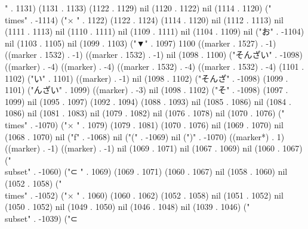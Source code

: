 " . 1131) (1131 . 1133) (1122 . 1129) nil (1120 . 1122) nil (1114 . 1120) ("\\times" . -1114) ("×
" . 1122) (1122 . 1124) (1114 . 1120) nil (1112 . 1113) nil (1111 . 1113) nil (1110 . 1111) nil (1109 . 1111) nil (1104 . 1109) nil ("お" . -1104) nil (1103 . 1105) nil (1099 . 1103) ("▼" . 1097) 1100 ((marker . 1527) . -1) ((marker . 1532) . -1) ((marker . 1532) . -1) nil (1098 . 1100) ("そんざい" . -1098) ((marker) . -4) ((marker) . -4) ((marker . 1532) . -4) ((marker . 1532) . -4) (1101 . 1102) ("い" . 1101) ((marker) . -1) nil (1098 . 1102) ("そんざ" . -1098) (1099 . 1101) ("んざい" . 1099) ((marker) . -3) nil (1098 . 1102) ("そ" . -1098) (1097 . 1099) nil (1095 . 1097) (1092 . 1094) (1088 . 1093) nil (1085 . 1086) nil (1084 . 1086) nil (1081 . 1083) nil (1079 . 1082) nil (1076 . 1078) nil (1070 . 1076) ("\\times" . -1070) ("×
" . 1079) (1079 . 1081) (1070 . 1076) nil (1069 . 1070) nil (1068 . 1070) nil ("f" . -1068) nil ("(" . -1069) nil (")" . -1070) ((marker*) . 1) ((marker) . -1) ((marker) . -1) nil (1069 . 1071) nil (1067 . 1069) nil (1060 . 1067) ("\\subset" . -1060) ("⊂
" . 1069) (1069 . 1071) (1060 . 1067) nil (1058 . 1060) nil (1052 . 1058) ("\\times" . -1052) ("×
" . 1060) (1060 . 1062) (1052 . 1058) nil (1051 . 1052) nil (1050 . 1052) nil (1049 . 1050) nil (1046 . 1048) nil (1039 . 1046) ("\\subset" . -1039) ("⊂
